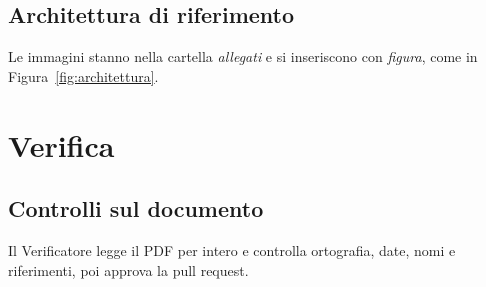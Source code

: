\subsection{Architettura di riferimento}
Le immagini stanno nella cartella \emph{allegati} e si inseriscono con
\emph{figura}, come in Figura~\ref{fig:architettura}.


\section{Verifica}
\subsection{Controlli sul documento}
Il Verificatore legge il PDF per intero e controlla ortografia, date,
nomi e riferimenti, poi approva la pull request.
